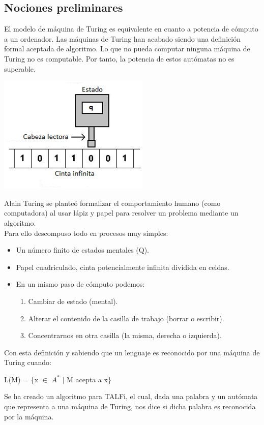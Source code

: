\documentclass[12pt,a4paper,spanish]{book}
\begin{document}
\subsection{Nociones preliminares}
El modelo de m\'aquina de Turing es equivalente en cuanto a potencia de c\'omputo a un ordenador.
Las m\'aquinas de Turing han acabado siendo una definici\'on formal aceptada de algoritmo. Lo que no pueda computar ninguna m\'aquina de Turing no es computable.
Por tanto, la potencia de estos aut\'omatas no es superable.\\

\begin{center}
\includegraphics{turi1.jpg}
\end{center}

Alain Turing se plante\'o formalizar el comportamiento humano (como computadora) al usar l\'apiz y papel para resolver un problema mediante un algoritmo.\\
Para ello descompuso todo en procesos muy simples:\\
\begin{itemize}
\item Un n\'umero finito de estados mentales (Q).
\item Papel cuadriculado, cinta potencialmente infinita dividida en celdas.
\item En un mismo paso de c\'omputo podemos:
\begin{enumerate}
\item Cambiar de estado (mental).
\item Alterar el contenido de la casilla de trabajo (borrar o escribir).
\item Concentrarnos en otra casilla (la misma, derecha o izquierda).
\end{enumerate}
\end{itemize}
Con esta definici\'on y sabiendo que un lenguaje es reconocido por una m\'aquina de Turing cuando:
\begin{center}
L(M) = \{x $\in$ $A^{*}$ $\mid$ M acepta  a x\}
\end{center}
Se ha creado un algoritmo para TALFi, el cual, dada una palabra y un aut\'omata que representa a una m\'aquina de Turing, nos dice si dicha palabra es reconocida por la m\'aquina.
\end{document}
